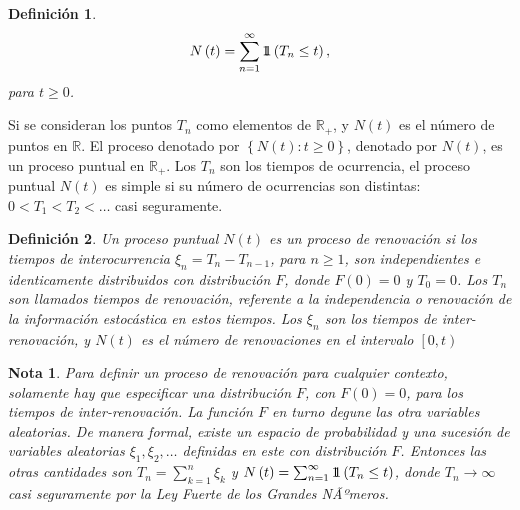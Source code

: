 \documentclass{article}
\newtheorem{Def}{Definición}[section]
\newtheorem{Note}{Nota}[section]
\newcommand{\rea}{\mathbb{R}}
\newcommand{\indora}{\mbox{$1$\hspace{-0.8ex}$1$}}
\numberwithin{equation}{section}
\begin{document}
{\begin{Def}
\begin{eqnarray}
N\left(t\right)=\sum_{n=1}^{\infty}\indora\left(T_{n}\leq t\right),
\end{eqnarray}
para $t\geq0$.
\end{Def}

Si se consideran los puntos $T_{n}$ como elementos de $\rea_{+}$, y $N\left(t\right)$ es el n\'umero de puntos en $\rea$. El proceso denotado por $\left\{N\left(t\right):t\geq0\right\}$, denotado por $N\left(t\right)$, es un proceso puntual en $\rea_{+}$. Los $T_{n}$ son los tiempos de ocurrencia, el proceso puntual $N\left(t\right)$ es simple si su n\'umero de ocurrencias son distintas: $0<T_{1}<T_{2}<\ldots$ casi seguramente.

\begin{Def}
Un proceso puntual $N\left(t\right)$ es un proceso de renovaci\'on si los tiempos de interocurrencia $\xi_{n}=T_{n}-T_{n-1}$, para $n\geq1$, son independientes e identicamente distribuidos con distribuci\'on $F$, donde $F\left(0\right)=0$ y $T_{0}=0$. Los $T_{n}$ son llamados tiempos de renovaci\'on, referente a la independencia o renovaci\'on de la informaci\'on estoc\'astica en estos tiempos. Los $\xi_{n}$ son los tiempos de inter-renovaci\'on, y $N\left(t\right)$ es el n\'umero de renovaciones en el intervalo $\left[0,t\right)$
\end{Def}


\begin{Note}
Para definir un proceso de renovaci\'on para cualquier contexto, solamente hay que especificar una distribuci\'on $F$, con $F\left(0\right)=0$, para los tiempos de inter-renovaci\'on. La funci\'on $F$ en turno degune las otra variables aleatorias. De manera formal, existe un espacio de probabilidad y una sucesi\'on de variables aleatorias $\xi_{1},\xi_{2},\ldots$ definidas en este con distribuci\'on $F$. Entonces las otras cantidades son $T_{n}=\sum_{k=1}^{n}\xi_{k}$ y $N\left(t\right)=\sum_{n=1}^{\infty}\indora\left(T_{n}\leq t\right)$, donde $T_{n}\rightarrow\infty$ casi seguramente por la Ley Fuerte de los Grandes NÃºmeros.
\end{Note}

%
%

}
\end{document}
